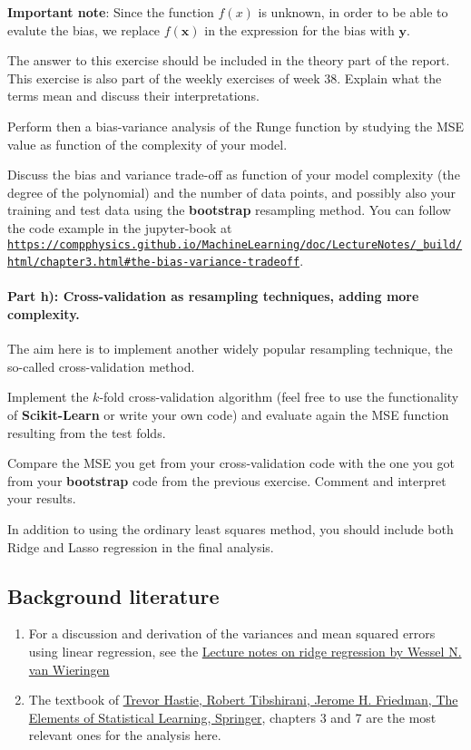 \documentclass[%
oneside,                 %
final,                   %
10pt]{article}
\begin{document}
\textbf{Important note}: Since the function $f(x)$ is unknown, in order to be able to evalute the bias, we replace $f(\bm{x})$ in the expression for the bias with $\bm{y}$. 

The answer to this exercise should be included in the theory part of
the report.  This exercise is also part of the weekly exercises of
week 38.  Explain what the terms mean and discuss their
interpretations.

Perform then a bias-variance analysis of the Runge function by
studying the MSE value as function of the complexity of your model.

Discuss the bias and variance trade-off as function
of your model complexity (the degree of the polynomial) and the number
of data points, and possibly also your training and test data using the \textbf{bootstrap} resampling method.
You can follow the code example in the jupyter-book at \href{{https://compphysics.github.io/MachineLearning/doc/LectureNotes/_build/html/chapter3.html#the-bias-variance-tradeoff}}{\nolinkurl{https://compphysics.github.io/MachineLearning/doc/LectureNotes/_build/html/chapter3.html\#the-bias-variance-tradeoff}}.

\paragraph{Part h):  Cross-validation as resampling techniques, adding more complexity.}
The aim here is to implement another widely popular
resampling technique, the so-called cross-validation method.  

Implement the $k$-fold cross-validation algorithm (feel free to use
the functionality of \textbf{Scikit-Learn} or write your own code) and
evaluate again the MSE function resulting from the test folds.

Compare the MSE you get from your cross-validation code with the one
you got from your \textbf{bootstrap} code from the previous exercise. Comment and interpret your results. 

In addition to using the ordinary least squares method, you should
include both Ridge and Lasso regression in the final analysis.

\subsection*{Background literature}

\begin{enumerate}
\item For a discussion and derivation of the variances and mean squared errors using linear regression, see the \href{{https://arxiv.org/abs/1509.09169}}{Lecture notes on ridge regression by Wessel N. van Wieringen}

\item The textbook of \href{{https://www.springer.com/gp/book/9780387848570}}{Trevor Hastie, Robert Tibshirani, Jerome H. Friedman, The Elements of Statistical Learning, Springer}, chapters 3 and 7 are the most relevant ones for the analysis here. 
\end{enumerate}
\end{document}
